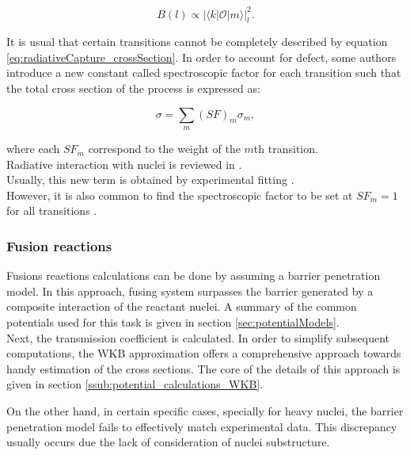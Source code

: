 \documentclass[openany]{book}
\begin{document}
\begin{equation}  \label{eq:radiativeCapture_reducedFactor}
	B(l) \propto   |{\langle k | \mathcal{O} | m \rangle}|^{2}_{l}.
\end{equation}

It is usual that certain transitions cannot be completely described by equation \ref{eq:radiativeCapture_crossSection}. In order to account for defect, some authors introduce a new constant called spectroscopic factor for each transition such that the total cross section of the process is expressed as: 

\begin{equation}  \label{eq:radiativeCapture_crossSection_SF}
	\sigma = \sum_{m}{{(SF)}_m\sigma_m},		
\end{equation}

where each ${SF}_m$ correspond to the weight of the $m$th transition. \\ 

Radiative interaction with nuclei is reviewed in \cite{blatt_weisskopf_1952}. \\

Usually, this new term is obtained by experimental fitting \cite{kabir_nabi_2021, xu_takahashi_goriely_arnould_ohta_utsunomiya_2013}. \\

However, it is also common to find the spectroscopic factor to be set at $SF_m = 1$ for all transitions \cite{bertulani_1996}.

\subsubsection{Fusion reactions} \label{ssub:potential_calculations_fusion}

Fusions reactions calculations can be done by assuming a barrier penetration model. In this approach, fusing system surpasses the barrier generated by a composite interaction of the reactant nuclei. A summary of the common potentials used for this task is given in section \ref{sec:potentialModels}. \\

Next, the transmission coefficient is calculated. In order to simplify subsequent computations, the WKB approximation offers a comprehensive approach towards handy estimation of the cross sections. The core of the details of this approach is given in section \ref{ssub:potential_calculations_WKB}.

On the other hand, in certain specific cases, specially for heavy nuclei, the barrier penetration model fails to effectively match experimental data. This discrepancy usually occurs due the lack of consideration of nuclei substructure. \\
\end{document}
